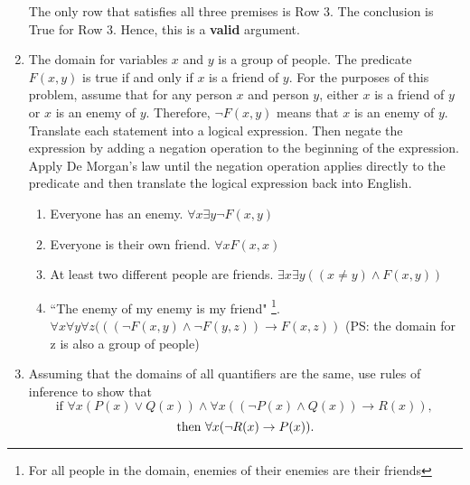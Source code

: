 \documentclass[12pt, oneside]{article}
\begin{document}
\begin{enumerate}
The only row that  satisfies all three premises is Row 3. The conclusion is True for Row 3. Hence, this is a \textbf{valid} argument.

\item The domain for variables $x$ and $y$ is a group of people.
The predicate $F(x, y)$ is true if and only if $x$ is a friend of
$y$. For the purposes of this problem, assume that for any person
$x$ and person $y$, either $x$ is a friend of $y$ or $x$ is an
enemy of $y$. Therefore, $\neg F(x, y)$ means that $x$ is an
enemy of $y$.
Translate each statement into a logical expression. Then negate
the expression by adding a negation operation to the beginning of
the expression. Apply De Morgan's law until the negation
operation applies directly to the predicate and then translate
the logical expression back into English.
\begin{enumerate}[noitemsep]
\item Everyone has an enemy. $\forall x \exists y \neg F(x, y)$
\item Everyone is their own friend. $\forall x F(x, x)$
\item At least two different people are friends. $\exists x \exists y ((x \neq y) \land F(x, y))$
\item``The enemy of my enemy is my friend" \footnote{For all
people in the domain, enemies of their enemies are their
friends}.
$\forall x \forall y \forall z ( ((\neg F(x, y) \land \neg F(y, z)) \to F(x, z) )$ (PS: the domain for z is also a group of people)
\end{enumerate}
\item Assuming that the domains of all quantifiers are the same,
use rules of inference to show that
$$ \text{if } \forall x(P(x)\lor Q(x)) \land \forall x((\neg
P(x)\land Q(x)) \to R(x)) \text{, }$$
$$\text{then } \forall x(\neg R(x) \to P(x)) . \\ $$


\end{enumerate}
\end{document}

